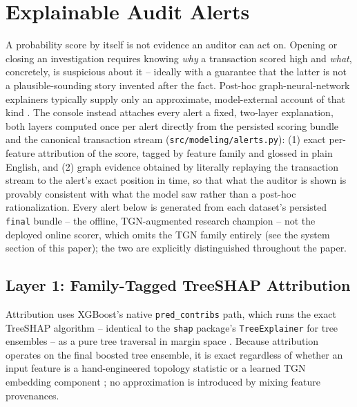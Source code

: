 \section{Explainable Audit Alerts}\label{sec:explain}

A probability score by itself is not evidence an auditor can act on.
Opening or closing an investigation requires knowing \emph{why} a
transaction scored high and \emph{what}, concretely, is suspicious about
it -- ideally with a guarantee that the latter is not a plausible-sounding
story invented after the fact. Post-hoc graph-neural-network explainers
typically supply only an approximate, model-external account of that kind
\cite{wang2023reinforced}. The console instead attaches every alert a
fixed, two-layer explanation, both layers computed once per alert directly
from the persisted scoring bundle and the canonical transaction stream
(\texttt{src/modeling/alerts.py}): (1) exact per-feature attribution of the
score, tagged by feature family and glossed in plain English, and (2) graph
evidence obtained by literally replaying the transaction stream to the
alert's exact position in time, so that what the auditor is shown is
provably consistent with what the model saw rather than a post-hoc
rationalization. Every alert below is generated from each dataset's
persisted \texttt{final} bundle -- the offline, TGN-augmented research
champion -- not the deployed online scorer, which omits the TGN family
entirely (see the system section of this paper); the two are explicitly
distinguished throughout the paper.

\subsection{Layer 1: Family-Tagged TreeSHAP Attribution}
Attribution uses XGBoost's native \texttt{pred\_contribs} path, which runs
the exact TreeSHAP algorithm -- identical to the \texttt{shap} package's
\texttt{TreeExplainer} for tree ensembles \cite{lundberg2017unified,
lundberg2020local} -- as a pure tree traversal in margin space
\cite{chen2016xgboost}. Because attribution operates on the final boosted
tree ensemble, it is exact regardless of whether an input feature is a
hand-engineered topology statistic or a learned TGN embedding component
\cite{rossi2020temporal}; no approximation is introduced by mixing feature
provenances.

